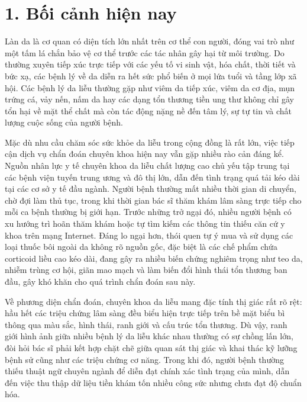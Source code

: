 
\section*{1. Bối cảnh hiện nay}

Làn da là cơ quan có diện tích lớn nhất trên cơ thể con người, đóng vai trò như một tấm lá chắn bảo vệ cơ thể trước các tác nhân gây hại từ môi trường. Do thường xuyên tiếp xúc trực tiếp với các yếu tố vi sinh vật, hóa chất, thời tiết và bức xạ, các bệnh lý về da diễn ra hết sức phổ biến ở mọi lứa tuổi và tầng lớp xã hội. Các bệnh lý da liễu thường gặp như viêm da tiếp xúc, viêm da cơ địa, mụn trứng cá, vảy nến, nấm da hay các dạng tổn thương tiền ung thư không chỉ gây tổn hại về mặt thể chất mà còn tác động nặng nề đến tâm lý, sự tự tin và chất lượng cuộc sống của người bệnh.

Mặc dù nhu cầu chăm sóc sức khỏe da liễu trong cộng đồng là rất lớn, việc tiếp cận dịch vụ chẩn đoán chuyên khoa hiện nay vẫn gặp nhiều rào cản đáng kể. Nguồn nhân lực y tế chuyên khoa da liễu chất lượng cao chủ yếu tập trung tại các bệnh viện tuyến trung ương và đô thị lớn, dẫn đến tình trạng quá tải kéo dài tại các cơ sở y tế đầu ngành. Người bệnh thường mất nhiều thời gian di chuyển, chờ đợi làm thủ tục, trong khi thời gian bác sĩ thăm khám lâm sàng trực tiếp cho mỗi ca bệnh thường bị giới hạn. Trước những trở ngại đó, nhiều người bệnh có xu hướng trì hoãn thăm khám hoặc tự tìm kiếm các thông tin thiếu căn cứ y khoa trên mạng Internet. Đáng lo ngại hơn, thói quen tự ý mua và sử dụng các loại thuốc bôi ngoài da không rõ nguồn gốc, đặc biệt là các chế phẩm chứa corticoid liều cao kéo dài, đang gây ra nhiều biến chứng nghiêm trọng như teo da, nhiễm trùng cơ hội, giãn mao mạch và làm biến đổi hình thái tổn thương ban đầu, gây khó khăn cho quá trình chẩn đoán sau này.

Về phương diện chẩn đoán, chuyên khoa da liễu mang đặc tính thị giác rất rõ rệt: hầu hết các triệu chứng lâm sàng đều biểu hiện trực tiếp trên bề mặt biểu bì thông qua màu sắc, hình thái, ranh giới và cấu trúc tổn thương. Dù vậy, ranh giới hình ảnh giữa nhiều bệnh lý da liễu khác nhau thường có sự chồng lấn lớn, đòi hỏi bác sĩ phải kết hợp chặt chẽ giữa quan sát thị giác và khai thác kỹ lưỡng bệnh sử cũng như các triệu chứng cơ năng. Trong khi đó, người bệnh thường thiếu thuật ngữ chuyên ngành để diễn đạt chính xác tình trạng của mình, dẫn đến việc thu thập dữ liệu tiền khám tốn nhiều công sức nhưng chưa đạt độ chuẩn hóa.


